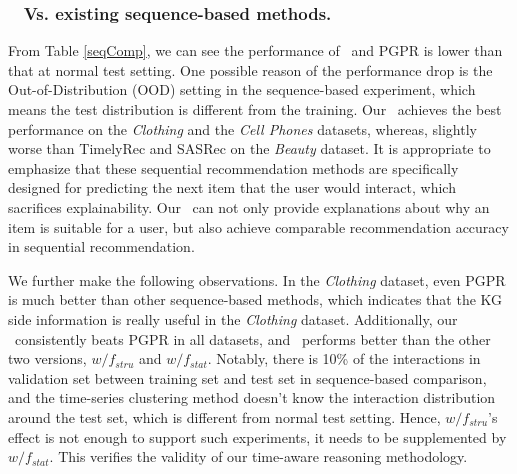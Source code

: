  \subsubsection{\textbf{\tkgrec~ Vs. existing sequence-based  methods.}}
 From Table \ref{seqComp}, we can see the performance of \tkgrec\ and PGPR is lower than that at normal test setting.
One possible reason of the performance drop is the Out-of-Distribution (OOD) setting in the sequence-based experiment, which means the test distribution is different from the training.
%
Our \tkgrec\ achieves the best performance on the \textit{Clothing} and the \textit{Cell Phones} datasets, whereas, slightly worse than TimelyRec and SASRec on the \textit{Beauty} dataset.
It is appropriate to emphasize that these sequential recommendation methods are specifically designed for predicting the next item that the user would interact, which sacrifices explainability. Our \tkgrec\ can not only provide explanations about why an item is suitable for a user, but also achieve comparable recommendation accuracy in sequential recommendation.


We further make the following observations. In the \textit{Clothing} dataset, even PGPR is much better than other sequence-based methods, which indicates that the KG side information is really useful in the \textit{Clothing} dataset. Additionally, our \tkgrec\ consistently beats PGPR in all  datasets, and \tkgrec\ performs better than the other two versions, $w/ f_{stru}$ and $w/ f_{stat}$. 
%
Notably, there is 10\% of the interactions in validation set between training set and test set in sequence-based comparison, and the time-series clustering method doesn't know the interaction distribution around the test set, which is different from normal test setting. 
Hence, $w/ f_{stru}$'s effect is not enough to support such experiments, it needs to be supplemented by $w/ f_{stat}$.
%
%
This verifies the validity of our time-aware reasoning methodology.

